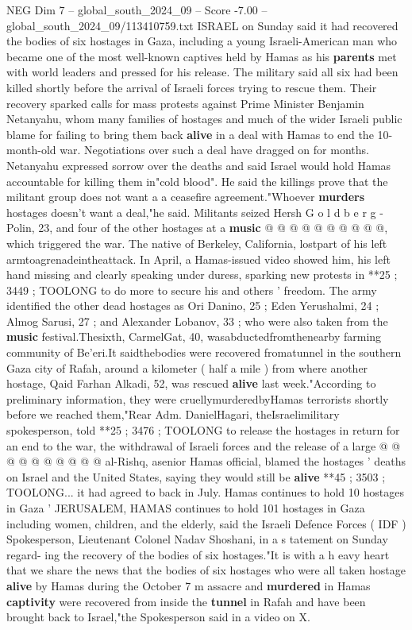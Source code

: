 \begin{textsample}{NEG Dim 7 – global\_south\_2024\_09 – Score -7.00 – global\_south\_2024\_09/113410759.txt}  \label{ex:f7_neg_180}
ISRAEL on Sunday said it had recovered the bodies of six hostages in Gaza, including a young Israeli-American man who became one of the most well-known captives held by Hamas as his \textbf{parents} met with world leaders and pressed for his release.
The military said all six had been killed shortly before the arrival of Israeli forces trying to rescue them.
Their recovery sparked calls for mass protests against Prime Minister Benjamin Netanyahu, whom many families of hostages and much of the wider Israeli public blame for failing to bring them back \textbf{alive} in a deal with Hamas to end the 10-month-old war.
Negotiations over such a deal have dragged on for months.
Netanyahu expressed sorrow over the deaths and said Israel would hold Hamas accountable for killing them in"cold blood".
He said the killings prove that the militant group does not want a a ceasefire agreement."Whoever \textbf{murders} hostages doesn't want a deal,"he said.
Militants seized Hersh G o l d b e r g - Polin, 23, and four of the other hostages at a \textbf{music} @ @ @ @ @ @ @ @ @ @, which triggered the war.
The native of Berkeley, California, lostpart of his left armtoagrenadeintheattack.
In April, a Hamas-issued video showed him, his left hand missing and clearly speaking under duress, sparking new protests in **25 ; 3449 ; TOOLONG to do more to secure his and others ' freedom.
The army identified the other dead hostages as Ori Danino, 25 ; Eden Yerushalmi, 24 ; Almog Sarusi, 27 ; and Alexander Lobanov, 33 ; who were also taken from the \textbf{music} festival.Thesixth, CarmelGat, 40, wasabductedfromthenearby farming community of Be'eri.It saidthebodies were recovered fromatunnel in the southern Gaza city of Rafah, around a kilometer ( half a mile ) from where another hostage, Qaid Farhan Alkadi, 52, was rescued \textbf{alive} last week."According to preliminary information, they were cruellymurderedbyHamas terrorists shortly before we reached them,"Rear Adm.
DanielHagari, theIsraelimilitary spokesperson, told **25 ; 3476 ; TOOLONG to release the hostages in return for an end to the war, the withdrawal of Israeli forces and the release of a large @ @ @ @ @ @ @ @ @ @ al-Rishq, asenior Hamas official, blamed the hostages ' deaths on Israel and the United States, saying they would still be \textbf{alive} **45 ; 3503 ; TOOLONG... it had agreed to back in July.
Hamas continues to hold 10 hostages in Gaza ' JERUSALEM, HAMAS continues to hold 101 hostages in Gaza including women, children, and the elderly, said the Israeli Defence Forces ( IDF ) Spokesperson, Lieutenant Colonel Nadav Shoshani, in a s tatement on Sunday regard- ing the recovery of the bodies of six hostages."It is with a h eavy heart that we share the news that the bodies of six hostages who were all taken hostage \textbf{alive} by Hamas during the October 7 m assacre and \textbf{murdered} in Hamas \textbf{captivity} were recovered from inside the \textbf{tunnel} in Rafah and have been brought back to Israel,"the Spokesperson said in a video on X.

\end{textsample}
